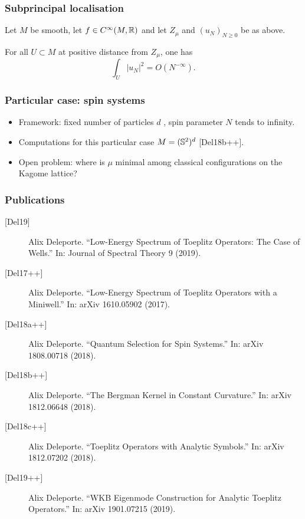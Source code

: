 \documentclass[mathserif]{beamer}
\begin{document}
\begin{frame}
  \frametitle{Subprincipal localisation}
  \begin{theorem}[{[Del17++]}]
    Let $M$ be smooth, let $f\in C^{\infty}(M,\R)$ and let $Z_{\mu}$ and
    $(u_N)_{N\geq 0}$ be as above.

    For all $U\subset M$ at positive distance from $Z_{\mu}$, one has
    \[
      \int_U
      |u_N|^2=O(N^{-\infty}).
      \]
  \end{theorem}
\end{frame}

\begin{frame}
  \frametitle{Particular case: spin systems}
  \begin{itemize}
\item  Framework: fixed number of particles $d$ , spin parameter $N$ tends to infinity.

  \item<2->{Computations for this particular case
    $M=(\S^2)^d$ [Del18b++].}

  \item<3>{{\color{myorange} Open problem}: where is $\mu$ minimal among classical
      configurations on the Kagome lattice?}
  \end{itemize}
\end{frame}

     \begin{frame}
        \frametitle{Publications}
        {\footnotesize
        \begin{description}
        \item[{[Del19]}] Alix Deleporte. “Low-Energy Spectrum of Toeplitz Operators: The Case
of Wells.” In: Journal of Spectral Theory 9 (2019).
\item[{[Del17++]}] Alix Deleporte. “Low-Energy Spectrum of Toeplitz Operators with a
Miniwell.” In: arXiv 1610.05902 (2017).
\item[{[Del18a++]}] Alix Deleporte. “Quantum Selection for Spin Systems.” In: arXiv
1808.00718 (2018).
\item[{[Del18b++]}] Alix Deleporte. “The Bergman Kernel in Constant Curvature.” In:
arXiv 1812.06648 (2018).
\item[{[Del18c++]}] Alix Deleporte. “Toeplitz Operators with Analytic Symbols.” In: arXiv
1812.07202 (2018).
\item[{[Del19++]}] Alix Deleporte. “WKB Eigenmode Construction for Analytic Toeplitz
  Operators.” In: arXiv 1901.07215 (2019).
        \end{description}}
      \end{frame}
\end{document}
